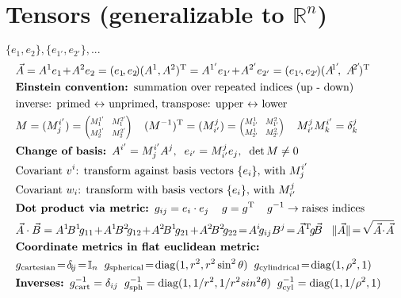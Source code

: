 \section*{\normalsize Tensors {\normalfont\scriptsize (generalizable to $\mathbb{R}^n$)}}
\underline{} $\{e_1, e_2\}, \{e_{1'}, e_{2'}\}, ... $
\begin{align*}
&\vec{A} = A^1 e_1\! +\! A^2 e_2 = (e_1\!, e_2\!) (A^1, A^2)^\mathrm{T} = A^{1'} e_{1'} \!+ \!A^{2'} e_{2'} = (e_{1'}\!, e_{2'}\!) (A\!^{1'}\!,\ A\!^{2'}\!)^\mathrm{T}\\
&\textbf{Einstein convention: } \text{summation over repeated indices (up - down)} \\
&\text{inverse: primed $\leftrightarrow$ unprimed,  transpose: upper $\leftrightarrow$ lower} \\
&M = (M^{i'}_j) = 
\scalebox{0.7}{$
\begin{pmatrix} M^{1'}_1 & M^{2'}_1 \vspace{2pt} \\ M^{1'}_2 & 
M^{2'}_2 \end{pmatrix} $}
\; \;\; \;  (M^{-1})^\mathrm{T}=(M^j_{i'}) =
\scalebox{0.7}{$\begin{pmatrix} M^{1}_{1'} & M^{2}_{1'}  \vspace{2pt} \\ M^{1}_{2'} & 
M^{2}_{2'} \end{pmatrix}$}
\; \;\; \;   M^j_{i'} M^{i'}_k= \delta^j_k \\
&\textbf{Change of basis: } A^{i'} = M^{i'}_j A^j, \;\; e_{i'} = M^j_{i'} e_j,\;\; \det M \neq 0 \\
&\text{Covariant $v^i$: transform against basis vectors $\{e_i\},$ with ${M_{j}^{i'}}$}\\
&\text{Covariant $w_i$: transform with basis vectors $\{e_i\},$ with ${M_{i'}^j}$}\\
&\textbf{Dot product via metric: } g_{ij} = e_i \cdot e_j\ \;\;\; g=g^\mathrm{T} \;\;\;\; g^{-1} \rightarrow \text{raises indices} \\
&\vec{A} \cdot \vec{B} = A^1\! B^1\! g_{11} \!+\! A^1\! B^2\! g_{12} \!+\! A^2\! B^1\! g_{21} \!+\! A^2\! B^2\! g_{22} \!= \! A^i\! g_{ij} B^j \!= \! \vec{A}^\mathrm{T}\! g\! \vec{B} \;\;\; \|\vec{A}\| \!= \!\sqrt{\vec{A} \!\cdot\! \vec{A}}\\
&\textbf{Coordinate metrics in flat euclidean metric: } \\
&g_{\text{cartesian}}\! = \!\delta\!_{i\!j} \!=\! \mathbb{I}_n\; \; g_{\text{spherical}} \!=\! \operatorname{diag} (1, r^2 , r^2 \sin ^2 \theta)\; \;  g_{\text{cylindrical}}\! =\! \operatorname{diag}(1,\rho^2,1) \\
&\textbf{Inverses: }g^{-1}_{\text{cart}}=\delta_{ij}\; \; g^{-1}_{\text{sph}}=\text{diag}(1,1/r^2,1/r^2 sin^2\theta)\;\; g^{-1}_{\text{cyl}}=\text{diag}(1,1/\rho^2,1)
\end{align*}
